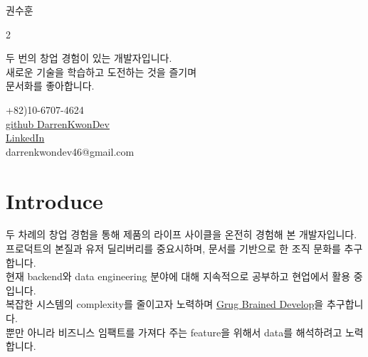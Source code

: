 \documentclass[letterpaper,12pt]{article}
\begin{document}
\begin{center}
    {\LARGE 권수훈} \\ \vspace{20pt}
    \begin{multicols}{2}
    \begin{flushleft}
    \small{두 번의 창업 경험이 있는 개발자입니다.} \\
    \small{새로운 기술을 학습하고 도전하는 것을 즐기며} \\ 
    \small{문서화를 좋아합니다.} \\ 
    \end{flushleft}
    
    \begin{flushright}
    \small{+82)10-6707-4624} \\
    \href{https://github.com/DarrenKwonDev
    }{github DarrenKwonDev} \\
    \href{https://www.linkedin.com/in/kwon-darren-b94a8a214/
    }{LinkedIn} \\
    \href{mailto:{darrenkwondev46@gmail.com}} \large{darrenkwondev46@gmail.com}
    \end{flushright}
    \end{multicols}
\end{center}


\section{Introduce}
\small{두 차례의 창업 경험을 통해 제품의 라이프 사이클을 온전히 경험해 본 개발자입니다.} \\
\small{프로덕트의 본질과 유저 딜리버리를 중요시하며, 문서를 기반으로 한 조직 문화를 추구합니다.} \\
\small{현재 backend와 data engineering 분야에 대해 지속적으로 공부하고 현업에서 활용 중입니다.} \\
\small{복잡한 시스템의 complexity를 줄이고자 노력하며 \href{https://grugbrain.dev/}{Grug Brained Develop}을 추구합니다. } \\
\small{뿐만 아니라 비즈니스 임팩트를 가져다 주는 feature을 위해서 data를 해석하려고 노력합니다.} \\
\end{document}
